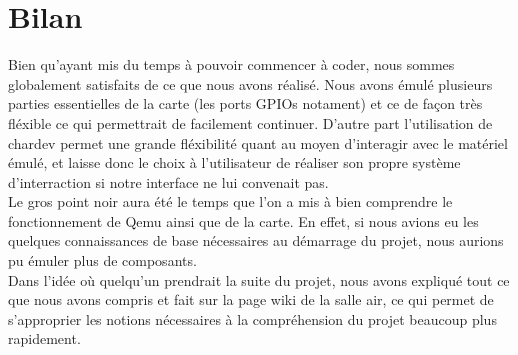 \documentclass{article}
\begin{document}
\section{Bilan}
	Bien qu'ayant mis du temps à pouvoir commencer à coder, nous sommes globalement satisfaits de ce que nous avons réalisé. Nous avons émulé
	plusieurs parties essentielles de la carte (les ports GPIOs notament) et ce de façon très fléxible ce qui permettrait de facilement continuer.
	D'autre part l'utilisation de chardev permet une grande fléxibilité quant au moyen d'interagir avec le matériel émulé, et laisse donc le choix
	à l'utilisateur de réaliser son propre système d'interraction si notre interface ne lui convenait pas.\\
	
	
	Le gros point noir aura été le temps que l'on a mis à bien comprendre le fonctionnement de Qemu ainsi que de la carte. En effet, si nous avions eu 
	les quelques connaissances de base nécessaires au démarrage du projet, nous aurions pu émuler plus de composants. \\
	Dans l'idée où quelqu'un prendrait la suite du projet, nous avons expliqué tout ce que nous avons compris et fait sur la page wiki de
	la salle air, ce qui permet de s'approprier les notions nécessaires à la compréhension du projet beaucoup plus rapidement. \\
\end{document}
